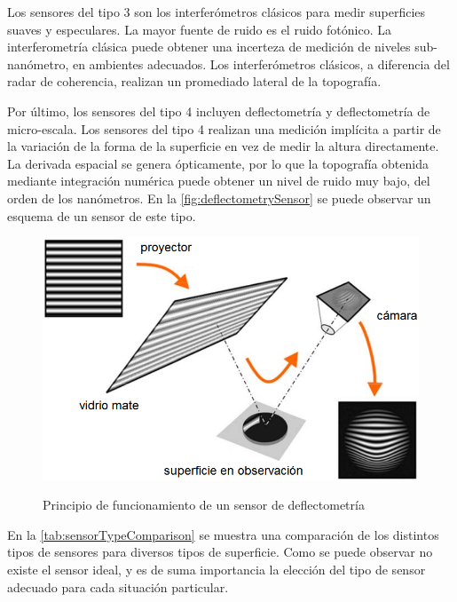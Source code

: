 Los sensores del tipo 3 son los interferómetros clásicos para medir superficies suaves y especulares. La mayor fuente de ruido es el ruido fotónico. La interferometría clásica puede obtener una incerteza de medición de niveles sub-nanómetro, en ambientes adecuados. Los interferómetros clásicos, a diferencia del radar de coherencia, realizan un promediado lateral de la topografía.

Por último, los sensores del tipo 4 incluyen deflectometría y deflectometría de micro-escala. Los sensores del tipo 4 realizan una medición implícita a partir de la variación de la forma de la superficie en vez de medir la altura directamente. La derivada espacial se genera ópticamente, por lo que la topografía obtenida mediante integración numérica puede obtener un nivel de ruido muy bajo, del orden de los nanómetros. En la \autoref{fig:deflectometrySensor} se puede observar un esquema de un sensor de este tipo.

\begin{figure}[bth]
    \myfloatalign
        {\includegraphics[width=0.85\linewidth]{images/deflectometrySensor}}
        \caption{Principio de funcionamiento de un sensor de deflectometría}
        \label{fig:deflectometrySensor}
\end{figure}

En la \autoref{tab:sensorTypeComparison} se muestra una comparación de los distintos tipos de sensores para diversos tipos de superficie. Como se puede observar no existe el sensor ideal, y es de suma importancia la elección del tipo de sensor adecuado para cada situación particular.

